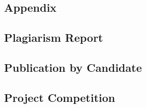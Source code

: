 \begin{appendices}
\chapter{Appendix}
  
\section{Plagiarism Report}
\newpage
\section{Publication by Candidate} %
\newpage
\section{Project Competition} %
\end{appendices}